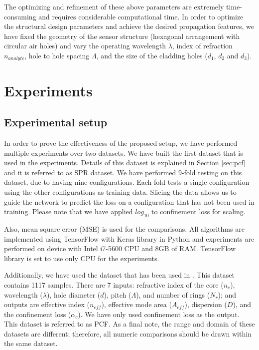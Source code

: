 \documentclass[journal]{IEEEtran}
\begin{document}
The optimizing and refinement of these above parameters are extremely time-consuming and requires considerable computational time. In order to optimize the structural design parameters and achieve the desired propagation features, we have fixed the geometry of the sensor structure (hexagonal arrangement with circular air holes) and vary the operating wavelength $\lambda$, index of refraction $n_{analyte}$, hole to hole spacing $\Lambda$, and the size of the cladding holes ($d_1$, $d_2$ and $d_3$).


\section{Experiments}
\label{sec:exp}

\subsection{Experimental setup}

\def\dszero{PCF}
In order to prove the effectiveness of the proposed setup, we have performed multiple experiments over two datasets. We have built the first dataset that is used in the experiments. Details of this dataset is explained in Section \ref{sec:pcf} and it is referred to as SPR dataset. We have performed 9-fold testing on this dataset, due to having nine configurations. Each fold tests a single configuration using the other configurations as training data. Slicing the data allows us to guide the network to predict the loss on a configuration that has not been used in training. Please note that we have applied $log_{10}$ to confinement loss for scaling.

Also, mean square error (MSE) is used for the comparisons. All algorithms are implemented using TensorFlow with Keras library in Python and experiments are performed on device with Intel i7-5600 CPU and 8GB of RAM. TensorFlow library is set to use only CPU for the experiments.

Additionally, we have used the dataset that has been used in \cite{paper0}. This dataset contains 1117 samples. There are 7 inputs: refractive index of the core ($n_c$), wavelength ($\lambda$), hole diameter ($d$), pitch ($\Lambda$), and number of rings ($N_r$);  and outputs are effective index ($n_{eff}$), effective mode area ($A_{eff}$), dispersion ($D$), and the confinement loss ($\alpha_c$). We have only used confinement loss as the output. This dataset is referred to as PCF. As a final note, the range and domain of these datasets are different; therefore, all numeric comparisons should be drawn within the same dataset.
\end{document}
